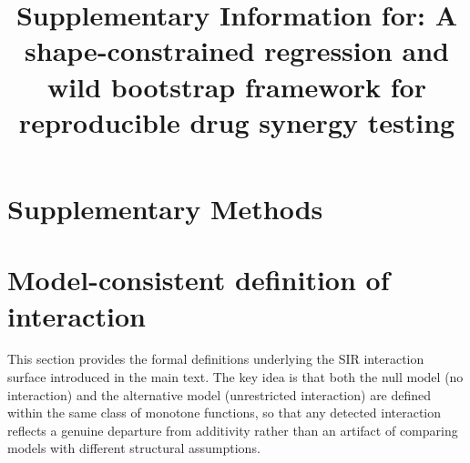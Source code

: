 \documentclass[pdflatex,sn-nature]{sn-jnl}%
\begin{document}
\title[Supplement]{Supplementary Information for: A shape-constrained regression and wild bootstrap framework for reproducible drug synergy testing}

\author*[1]{ }
\author[2]{ }
\author[1]{ }
\author[3]{ }
\author[4]{ }


\maketitle

\section*{Supplementary Methods}

\section{Model-consistent definition of interaction}

This section provides the formal definitions underlying the SIR interaction surface introduced in the main text.
The key idea is that both the null model (no interaction) and the alternative model (unrestricted interaction) are defined within the same class of monotone functions, so that any detected interaction reflects a genuine departure from additivity rather than an artifact of comparing models with different structural assumptions.
\end{document}
